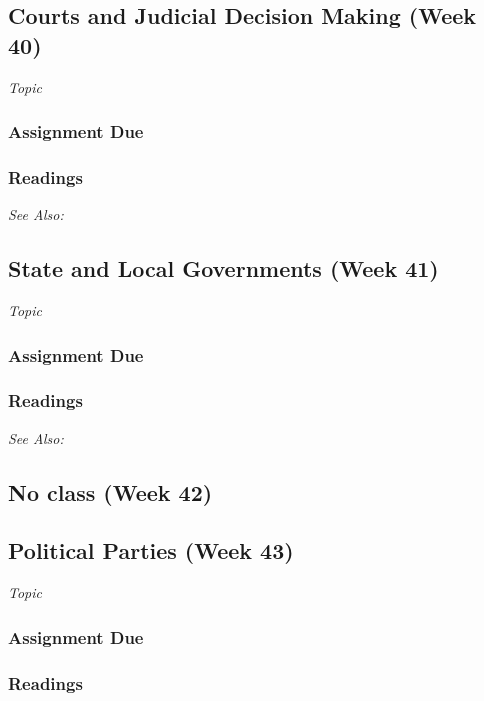 \documentclass[12pt,a4paper]{article}
\newcommand{\seealso}{\noindent \emph{See Also:}\\}
\begin{document}
\clearpage
\subsection{Courts and Judicial Decision Making (Week 40)}
\emph{Topic}

\vspace{1em}
\subsubsection*{Assignment Due}

\subsubsection*{Readings}

\seealso



\clearpage
\subsection{State and Local Governments (Week 41)}
\emph{Topic}
\vspace{1em}
\subsubsection*{Assignment Due}

\subsubsection*{Readings}

\seealso


\clearpage
\subsection{No class (Week 42)}

\clearpage
\subsection{Political Parties (Week 43)}
\emph{Topic}
\vspace{1em}

\subsubsection*{Assignment Due}

\subsubsection*{Readings}
\end{document}
